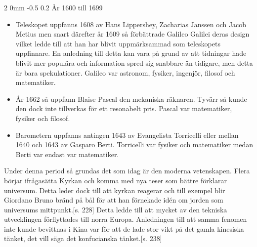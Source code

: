 \documentclass[a4paper,12pt]{article}
\makeatletter
\renewcommand{\subsection}{\@startsection
   {subsection}%
   {2}%
   {0mm}%
   {-0.5\baselineskip}%
   {0.2\baselineskip}%
   {\rmfamily\normalfont\slshape\normalsize}}%
\makeatother
\begin{document}
\subsection{År 1600 till 1699}
\begin{itemize}
\item Teleskopet uppfanns 1608 av Hans Lippershey,  Zacharias Janssen och Jacob Metius men snart därefter år 1609 så förbättrade Galileo Galilei deras design vilket ledde till att han har blivit uppmärksammad som teleskopets uppfinnare.\cite{telescope} En anledning till detta kan vara på grund av att tidningar hade blivit mer populära och information spred sig snabbare än tidigare, men detta är bara spekulationer. Galileo var astronom, fysiker, ingenjör, filosof och matematiker.\cite{galileo-life}

\item År 1662 så uppfann Blaise Pascal den mekaniska räknaren. Tyvärr så kunde den dock inte tillverkas för ett resonabelt pris.\cite{calculator} Pascal var matematiker, fysiker och filosof.\cite{pascal-life}

\item Barometern uppfanns antingen 1643 av Evangelista Torricelli eller mellan 1640 och 1643 av Gasparo Berti.\cite{barometer} Torricelli var fysiker och matematiker \cite{torricelli-life} medan Berti var endast var matematiker.\cite{berti-life}
\end{itemize}

\noindent
Under denna period så grundas det som idag är den moderna vetenskapen. Flera börjar ifrågasätta Kyrkan och komma med nya teser som bättre förklarar universum. Detta leder dock till att kyrkan reagerar och till exempel blir Giordano Bruno bränd på bål för att han förnekade idén om jorden som universums mittpunkt.\cite{hansson}[s. 228] Detta ledde till att mycket av den tekniska utvecklingen förflyttades till norra Europa. Anledningen till att samma fenomen inte kunde bevittnas i Kina var för att de lade stor vikt på det gamla kinesiska tänket, det vill säga det konfucianska tänket.\cite{hansson}[s. 238]
\end{document}

